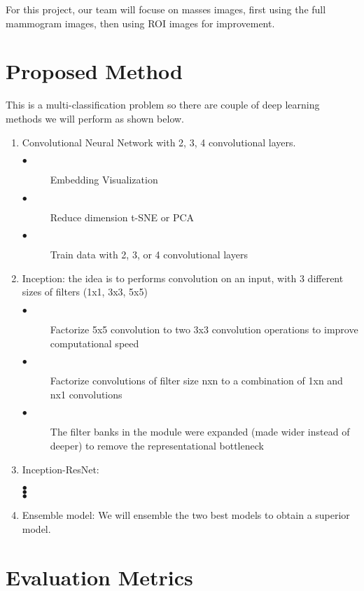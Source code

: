 \documentclass[ruled]{article}
\begin{document}
For this project, our team will focuse on masses images, first using the full mammogram images, then using ROI images for improvement. 


\section{Proposed Method}

This is a multi-classification problem so there are couple of deep learning methods we will perform as shown below. 
\begin{enumerate}
\item Convolutional Neural Network with 2, 3, 4 convolutional layers.
\begin{description}
  \item[$\bullet$] Embedding Visualization 
  \item[$\bullet$] Reduce dimension t-SNE or PCA
  \item[$\bullet$] Train data with 2, 3, or 4 convolutional layers
\end{description}

\item Inception: the idea is to performs convolution on an input, with 3 different sizes of filters (1x1, 3x3, 5x5)
\begin{description}
  \item[$\bullet$] Factorize 5x5 convolution to two 3x3 convolution operations to improve computational speed
  \item[$\bullet$] Factorize convolutions of filter size nxn to a combination of 1xn and nx1 convolutions
  \item[$\bullet$] The filter banks in the module were expanded (made wider instead of deeper) to remove the representational bottleneck
\end{description}


\item Inception-ResNet: 
\begin{description}
  \item[$\bullet$] 
  \item[$\bullet$] 
  \item[$\bullet$] 
\end{description}

\item Ensemble model: We will ensemble the two best models to obtain a superior model.

\end{enumerate}


\section{Evaluation Metrics}
\end{document}

